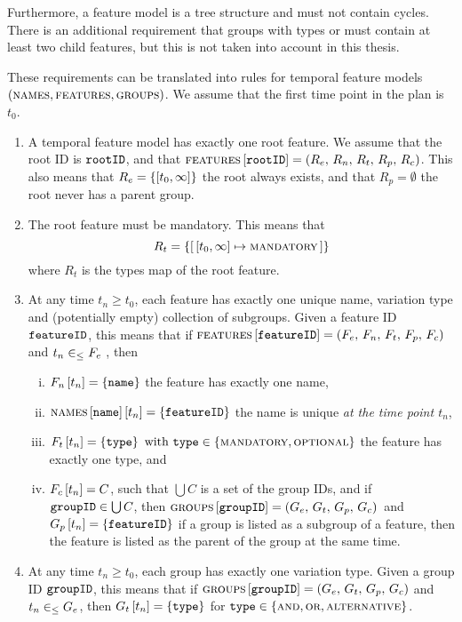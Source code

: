 Furthermore, a feature model is a tree structure and must not contain cycles. There is an additional requirement that groups with types \xortype{} or \ortype{} must contain at least two child features, but this is not taken into account in this thesis.

These requirements can be translated into rules for temporal feature models $(\textsc{names}, \textsc{features}, \textsc{groups}{})$. We assume that the first time point in the plan is $t_0$.

\begin{enumerate}[\itbf{WF\arabic*}, itemsep=0mm]
   \item A temporal feature model has exactly one root feature. We assume that the root ID is $\texttt{rootID}$, and that $\textsc{features} \left[ \texttt{rootID} \right] = \left(R_e,\, R_n,\, R_t,\, R_p,\, R_c\right)$. This also means that $R_e=\set{\interval{t_0}{\forever}}$ \textemdash{} the root always exists, and that $R_p = \emptyset$ \textemdash{} the root never has a parent group.
\item The root feature must be mandatory. This means that $$R_t  = \set{\intervalmapping{t_0}{\forever}{\mandatory}}$$ where $R_t$ is the types map of the root feature. 
\item At any time $t_n \geq t_0$, each feature has exactly one unique name, variation type and (potentially empty) collection of subgroups. Given a feature ID $\texttt{featureID}$, this means that if $\textsc{features} \left[ \texttt{featureID} \right] = \left(F_e,\, F_n,\, F_t,\, F_p,\, F_c\right)$ and $t_n \in_\leq F_e$ , then
   \begin{enumerate}[(i)]
      \item $F_n \left[ t_n \right] = \left\{\texttt{name}\right\}$ \textemdash{} the feature has exactly one name,
      \item $\textsc{names} \left[ \texttt{name} \right] \left[ t_n \right] = \left\{\texttt{featureID}\right\}$ \textemdash{} the name is unique \emph{at the time point $t_n$},
      \item $F_t \left[ t_n \right] = \left\{\texttt{type}\right\} \text{ with } \texttt{type} \in \left\{\textsc{mandatory}, \textsc{optional}\right\}$ \textemdash{} the feature has exactly one type, and
      \item $F_c \left[ t_n \right] = C$, such that $\bigcup C$ is a set of the group IDs, and if $\texttt{groupID} \in \bigcup C$, then $\textsc{groups}{} \left[ \texttt{groupID} \right] = \left(G_e,\, G_t,\, G_p,\, G_c\right){}$ and $G_p \left[ t_n \right] = \left\{\texttt{featureID}\right\}$ \textemdash{} if a group is listed as a subgroup of a feature, then the feature is listed as the parent of the group at the same time.
   \end{enumerate}
   \item At any time $t_n \geq t_0$, each group has exactly one variation type. Given a group ID $\texttt{groupID}$, this means that if $\textsc{groups}{} \left[ \texttt{groupID} \right] = \left(G_e,\, G_t,\, G_p,\, G_c\right)$ and $t_n \in_\leq G_e$, then $G_t \left[ t_n \right] = \left\{\texttt{type}\right\}$ for $\texttt{type} \in \left\{\textsc{and}, \textsc{or}, \textsc{alternative}\right\}$.

\end{enumerate}
